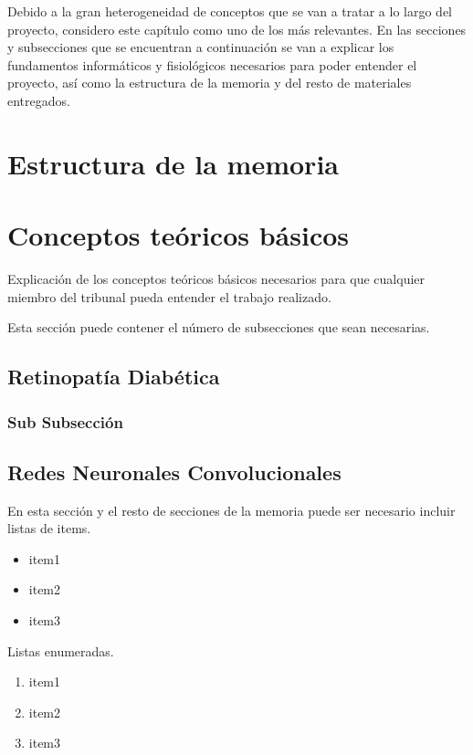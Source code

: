 
Debido a la gran heterogeneidad de conceptos que se van a tratar a lo largo del proyecto, considero este capítulo como uno de los más relevantes. En las secciones y subsecciones que se encuentran a continuación se van a explicar los fundamentos informáticos y fisiológicos necesarios para poder entender el proyecto, así como la estructura de la memoria y del resto de materiales entregados.

\section{Estructura de la memoria}

\section{Conceptos teóricos básicos}

Explicación de los conceptos teóricos básicos necesarios para que cualquier miembro del tribunal pueda entender el trabajo realizado.

Esta sección puede contener el número de subsecciones que sean necesarias.\cite{wiki:latex}

\subsection{Retinopatía Diabética}

\subsubsection{Sub Subsección}

\subsection{Redes Neuronales Convolucionales}

En esta sección y el resto de secciones de la memoria puede ser necesario incluir listas de items.

\begin{itemize}
    \item item1
    \item item2
    \item item3
\end{itemize}

Listas enumeradas.

\begin{enumerate}
    \item item1
    \item item2
    \item item3
\end{enumerate}

